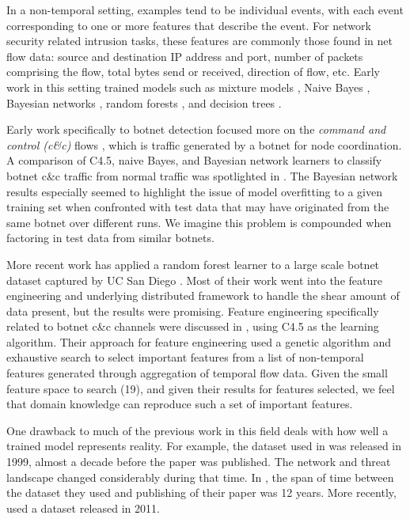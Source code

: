 \documentclass[letterpaper]{article}
\begin{document}
In a non-temporal setting, examples tend to be individual events, with each event corresponding to one or more features that describe the event.  For network security related intrusion tasks, these features are commonly those found in net flow data: source and destination IP address and port, number of packets comprising the flow, total bytes send or received, direction of flow, etc.  Early work in this setting trained models such as mixture models \cite{Puttini02bayesianclassification}, Naive Bayes \cite{10.1007/978-3-642-00670-8_9}, Bayesian networks \cite{1254306,Xu:2010:IDU:1946417.1946434}, random forests \cite{Zhang:2008:RNI:2220436.2221144}, and decision trees \cite{Osanaiye2016}.

Early work specifically to botnet detection focused more on the \emph{command and control (c\&c)} flows \cite{4116687,Gu2008BotSnifferDB,Cho:2010:IAF:1866307.1866355,EURECOM+3886,DIETRICH2013475}, which is traffic generated by a botnet for node coordination.   A comparison of C4.5, naive Bayes, and Bayesian network learners to classify botnet c\&c traffic from normal traffic was spotlighted in \cite{4116687}.  The Bayesian network results especially seemed to highlight the issue of model overfitting to a given training set when confronted with test data that may have originated from the same botnet over different runs.  We imagine this problem is compounded when factoring in test data from similar botnets.

More recent work has applied a random forest learner to a large scale botnet dataset captured by UC San Diego \cite{SINGH2014488}.  Most of their work went into the feature engineering and underlying distributed framework to handle the shear amount of data present, but the results were promising.  Feature engineering specifically related to botnet c\&c channels were discussed in \cite{7891834}, using C4.5 as the learning algorithm.  Their approach for feature engineering used a genetic algorithm and exhaustive search to select important features from a list of non-temporal features generated through aggregation of temporal flow data.  Given the small feature space to search (19), and given their results for features selected, we feel that domain knowledge can reproduce such a set of important features.

One drawback to much of the previous work in this field deals with how well a trained model represents reality.  For example, the dataset used in \cite{Zhang:2008:RNI:2220436.2221144} was released in 1999, almost a decade before the paper was published.  The network and threat landscape changed considerably during that time.  In \cite{Xu:2010:IDU:1946417.1946434}, the span of time between the dataset they used and publishing of their paper was 12 years.  More recently, \cite{7891834} used a dataset released in 2011.
\end{document}
